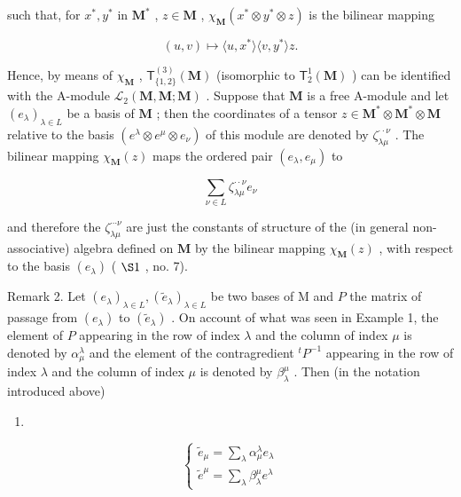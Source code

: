 such that, for \(x^{*}, y^{*}\) in \(\mathbf{M}^{*}\) , \(z \in \mathbf{M}\) , \(\chi_{\mathbf{M}}(x^{*} \otimes y^{*} \otimes z)\) is the bilinear mapping

\[
(u, v) \mapsto \langle u, x ^ {*} \rangle \langle v, y ^ {*} \rangle z.
\]

Hence, by means of \(\chi_{\mathbf{M}}\) , \(\mathsf{T}_{\{1,2\}}^{(3)}(\mathbf{M})\) (isomorphic to \(\mathsf{T}_{2}^{1}(\mathbf{M})\) ) can be identified with the A-module \(\mathcal{L}_2(\mathbf{M},\mathbf{M};\mathbf{M})\) . Suppose that \(\mathbf{M}\) is a free A-module and let \((e_{\lambda})_{\lambda \in L}\) be a basis of \(\mathbf{M}\) ; then the coordinates of a tensor \(z\in \mathbf{M}^*\otimes \mathbf{M}^*\otimes \mathbf{M}\) relative to the basis \((e^{\lambda}\otimes e^{\mu}\otimes e_{\nu})\) of this module are denoted by \(\zeta_{\lambda \mu}^{\cdot \cdot \nu}\) . The bilinear mapping \(\chi_{\mathbf{M}}(z)\) maps the ordered pair \((e_{\lambda},e_{\mu})\) to

\[
\sum_ {\nu \in L} \zeta_ {\lambda \mu}^{\cdot \cdot \nu} e _ {\nu}
\]

and therefore the \(\zeta_{\lambda \mu}^{\cdots \nu}\) are just the constants of structure of the (in general non-associative) algebra defined on \(\mathbf{M}\) by the bilinear mapping \(\chi_{\mathbf{M}}(z)\) , with respect to the basis \((e_{\lambda})\) ( \(\S 1\) , no. 7).

Remark 2. Let \((e_{\lambda})_{\lambda \in L}, (\tilde{e}_{\lambda})_{\lambda \in L}\) be two bases of M and \(P\) the matrix of passage from \((e_{\lambda})\) to \((\tilde{e}_{\lambda})\) . On account of what was seen in Example 1, the element of \(P\) appearing in the row of index \(\lambda\) and the column of index \(\mu\) is denoted by \(\alpha_{\mu}^{\lambda}\) and the element of the contragredient \(^{t}P^{-1}\) appearing in the row of index \(\lambda\) and the column of index \(\mu\) is denoted by \(\beta_{\lambda}^{\mu}\) . Then (in the notation introduced above)

\begin{enumerate}
\def\labelenumi{(\arabic{enumi})}
\setcounter{enumi}{18}
\tightlist
\item
\end{enumerate}

\[
\left\{ \begin{array}{l} \tilde {e} _ {\mu} = \sum_ {\lambda} \alpha_ {\mu} ^ {\lambda} e _ {\lambda} \\ \tilde {e} ^ {\mu} = \sum_ {\lambda} \beta_ {\lambda} ^ {\mu} e ^ {\lambda} \end{array} \right.\tag{20}
\]

